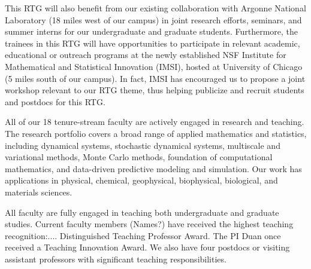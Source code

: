 \documentclass[11pt]{article}
\begin{document}
This RTG will also benefit from our existing collaboration with  Argonne National Laboratory (18 miles west of our campus) in joint research   efforts, seminars, and summer interns for   our undergraduate and graduate students. Furthermore, the trainees in this RTG will have opportunities to participate in relevant academic, educational or outreach programs at the newly established NSF   Institute for Mathematical and Statistical Innovation (IMSI),  hosted at University of Chicago (5 miles south of our campus). In fact, IMSI has encouraged us to propose a joint  workshop relevant to our RTG theme,   thus helping publicize and recruit students and postdocs for this RTG.

   
 

   




 
All of our 18 tenure-stream faculty are actively engaged in research and teaching. The research portfolio covers a broad range of applied mathematics and statistics, including dynamical systems, stochastic dynamical systems, multiscale and variational methods,  Monte Carlo methods, foundation of computational mathematics, and data-driven predictive modeling and simulation. Our work has applications in physical, chemical, geophysical, biophysical, biological, and materials sciences. 

All faculty are fully engaged in teaching both undergraduate
and graduate studies.   Current faculty members (Names?) have received the highest
teaching recognition:.... Distinguished Teaching Professor Award. The PI Duan once received a Teaching Innovation Award. We also have four postdocs or visiting assistant professors with significant teaching responsibilities. 
\end{document}
